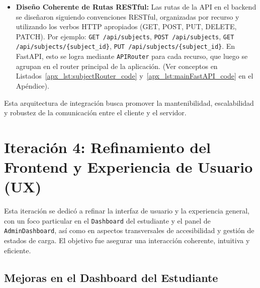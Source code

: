\begin{itemize}[leftmargin=*]
  \item \textbf{Diseño Coherente de Rutas RESTful:} Las rutas de la API en el backend se diseñaron siguiendo convenciones RESTful, organizadas por recurso y utilizando los verbos HTTP apropiados (GET, POST, PUT, DELETE, PATCH). Por ejemplo: \texttt{GET /api/subjects}, \texttt{POST /api/subjects}, \texttt{GET /api/subjects/\{subject\_id\}}, \texttt{PUT /api/subjects/\{subject\_id\}}. En FastAPI, esto se logra mediante \texttt{APIRouter} para cada recurso, que luego se agrupan en el router principal de la aplicación. (Ver conceptos en Listados~\ref{apx_lst:subjectRouter_code} y~\ref{apx_lst:mainFastAPI_code} en el Apéndice).
\end{itemize}
Esta arquitectura de integración busca promover la mantenibilidad, escalabilidad y robustez de la comunicación entre el cliente y el servidor.

\section{Iteración 4: Refinamiento del Frontend y Experiencia de Usuario (UX)}
\label{sec:desarrollo_iter4_frontend_ux}

Esta iteración se dedicó a refinar la interfaz de usuario y la experiencia general, con un foco particular en el \texttt{Dashboard} del estudiante y el panel de \texttt{AdminDashboard}, así como en aspectos transversales de accesibilidad y gestión de estados de carga. El objetivo fue asegurar una interacción coherente, intuitiva y eficiente.

\subsection{Mejoras en el Dashboard del Estudiante}
\label{ssec:desarrollo_iter4_dashboard_ux}

